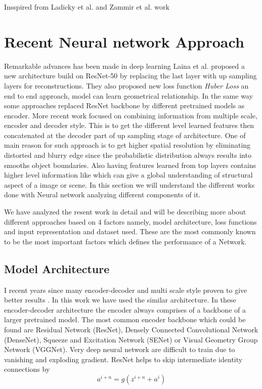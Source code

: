 Insspired from Ladicky et al. and Zammir et al. work 



\section{Recent Neural network Approach}
\label{Chapter3:RelatedWork_NNModel}
 Remarkable advances has been made in deep learning Laina et al. \cite{laina2016deeper} proposed a new architecture build on ResNet-50 by replacing the last layer with up sampling layers for reconstructions. They also proposed new loss function \textit{Huber Loss} an end to end approach, model can learn geometrical relationship. In the same way some approaches replaced ResNet backbone by different pretrained models as encoder\cite{Alhashim2018, hu2019revisiting}. More recent work focused on combining information from multiple scale, encoder and decoder style. This is to get the different level learned features \cite{Xu_2018_CVPR, Eigen_2015_ICCV} then concatenated at the decoder part of up sampling stage of architecture. One of main reason for such approach is to get higher spatial resolution by eliminating distorted and blurry edge since the probabilistic distribution always results into smooths object boundaries\cite{hu2019revisiting}. Also having features learned from top layers contains higher level information like which can give a global understanding of structural aspect of a image or scene. In this section we will understand the different works done with Neural network analyzing different components of it.

We have analyzed the resent work in detail and will be describing more about different approaches based on 4 factors namely, model architecture, loss functions and input representation and dataset used. These are the most commonly known to be the most important factors which defines the performance of a Network.  

\subsection{Model Architecture}
\label{Chapter3:ModelArch}
I recent years since many encoder-decoder and multi scale style proven to give better results \cite{Alhashim2018, hu2019revisiting}. In this work we have used the similar architecture. In these encoder-decoder architecture the encoder always comprises of a backbone of a larger pretrained model. The most common encoder backbone which could be found are Residual Network (ResNet), Densely Connected Convolutional Network (DenseNet), Squeeze and Excitation Network (SENet) or Visual Geometry Group Network (VGGNet)\cite{hu2019revisiting}. Very deep neural network are difficult to train due to vanishing and exploding gradient. ResNet helps to skip intermediate identity connections by 
\begin{equation} \label{eqResNet}
    {a^{i+n}=g(z^{i+n} + a^i)}
\end{equation}


